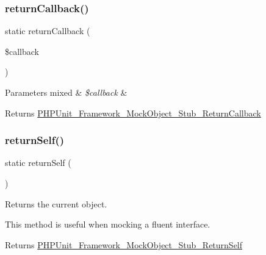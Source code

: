 \subsubsection{\texorpdfstring{return\+Callback()}{returnCallback()}}
{\footnotesize\ttfamily static return\+Callback (\begin{DoxyParamCaption}\item[{}]{\$callback }\end{DoxyParamCaption})\hspace{0.3cm}{\ttfamily [static]}}


\begin{DoxyParams}[1]{Parameters}
mixed & {\em \$callback} & \\
\hline
\end{DoxyParams}
\begin{DoxyReturn}{Returns}
\mbox{\hyperlink{class_p_h_p_unit___framework___mock_object___stub___return_callback}{P\+H\+P\+Unit\+\_\+\+Framework\+\_\+\+Mock\+Object\+\_\+\+Stub\+\_\+\+Return\+Callback}} 
\end{DoxyReturn}
\mbox{\label{class_p_h_p_unit___framework___test_case_a2aaa059e6e724a0cb012d1186006491c}} 
\subsubsection{\texorpdfstring{return\+Self()}{returnSelf()}}
{\footnotesize\ttfamily static return\+Self (\begin{DoxyParamCaption}{ }\end{DoxyParamCaption})\hspace{0.3cm}{\ttfamily [static]}}

Returns the current object.

This method is useful when mocking a fluent interface.

\begin{DoxyReturn}{Returns}
\mbox{\hyperlink{class_p_h_p_unit___framework___mock_object___stub___return_self}{P\+H\+P\+Unit\+\_\+\+Framework\+\_\+\+Mock\+Object\+\_\+\+Stub\+\_\+\+Return\+Self}} 
\end{DoxyReturn}
\mbox{\label{class_p_h_p_unit___framework___test_case_a499db61d9a3d9d1169f1c7ca83c0f27b}} 
